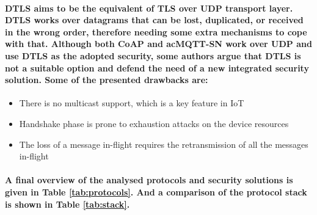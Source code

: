\paragraph{
	\ac{DTLS} aims to be the equivalent of \ac{TLS} over \ac{UDP} transport layer. \ac{DTLS} works over datagrams that can be lost, duplicated, or received in the wrong order, therefore needing some extra mechanisms to cope with that. Although both \ac{CoAP} and ac{MQTT-SN} work over \ac{UDP} and use \ac{DTLS} as the adopted security, some authors argue that \ac{DTLS} is not a suitable option \cite{Alghamdi2013} and defend the need of a new integrated security solution. Some of the presented drawbacks are:
}

\begin{itemize}
	\item There is no multicast support, which is a key feature in \ac{IoT}
	\item Handshake phase is prone to exhaustion attacks on the device resources
	\item The loss of a message in-flight requires the retransmission of all the messages in-flight
\end{itemize}

\paragraph{
	A final overview of the analysed protocols and security solutions is given in Table \ref{tab:protocols}. And a comparison of the protocol stack is shown in Table \ref{tab:stack}.
} 


